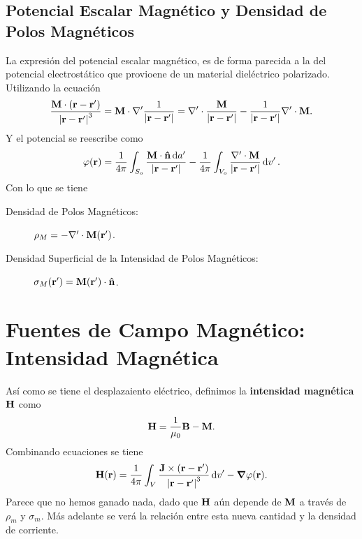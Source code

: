 \subsection{Potencial Escalar Magnético y Densidad de Polos Magnéticos}
La expresión del potencial escalar magnético, es de forma parecida a la del potencial electrostático que provioene de un material dieléctrico polarizado. Utilizando la ecuación
\begin{equation}
	\frac{\vb{M} \cdot (\vb{r} - \vb{r}^\prime)}{\abs{\vb{r} - \vb{r} ^\prime}^3} = \vb{M} \cdot \nabla ^\prime \frac{1}{\abs{\vb{r} - \vb{r} ^\prime}} = \nabla ^\prime \cdot \frac{\vb{M}}{\abs{\vb{r} - \vb{r} ^\prime}} - \frac{1}{\abs{\vb{r} - \vb{r} ^\prime}} \nabla ^\prime \cdot \vb{M} .
\end{equation}
Y el potencial se reescribe como
\begin{equation}
	\varphi (\vb{r}) = \frac{1}{4\pi} \int _{S_o} \frac{\vb{M} \cdot \vu{n} \dd{a^\prime}}{\abs{\vb{r} - \vb{r}^\prime}} - \frac{1}{4\pi} \int _{V_o} \frac{\nabla ^\prime \cdot \vb{M}}{\abs{\vb{r} - \vb{r}^\prime}} \dd{v^\prime}.
\end{equation}
Con lo que se tiene
\begin{description}
	\item[Densidad de Polos Magnéticos: ] $\rho _M = -\nabla ^\prime \cdot \vb{M} (\vb{r} ^\prime)$.
	\item[Densidad Superficial de la Intensidad de Polos Magnéticos: ] $\sigma _M (\vb{r} ^\prime) = \vb{M} (\vb{r}^\prime) \cdot \vu{n}$.
\end{description}

\section{Fuentes de Campo Magnético: Intensidad Magnética}
Así como se tiene el desplazaiento eléctrico, definimos la \textbf{intensidad magnética} $\vb{H}$ como
\begin{equation}
	\vb{H} = \frac{1}{\mu_0} \vb{B} - \vb{M}.
\end{equation}
Combinando ecuaciones se tiene
\begin{equation}
	\vb{H} (\vb{r}) = \frac{1}{4\pi} \int _V \frac{\vb{J} \times (\vb{r} - \vb{r} ^\prime)}{\abs{\vb{r} - \vb{r} ^\prime}^3} \dd{v}^\prime - \grad{\varphi} (\vb{r}).
\end{equation}
Parece que no hemos ganado nada, dado que $\vb{H}$ aún depende de $\vb{M}$ a través de $\rho _m$ y $\sigma _m$. Más adelante se verá la relación entre esta nueva cantidad y la densidad de corriente. 




